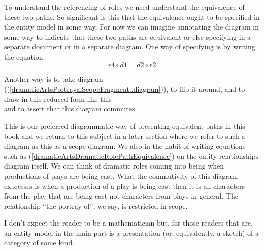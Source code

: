 \begin{reinstatett}
\begin{reinstatett}
To understand the referencing of roles we need understand the equivalence of these two paths. 
So significant is this that the equivalence ought to be specified in the entity model in some way.
For now we can imagine annotating the diagram in some way to indicate that these two paths are equivalent 
or else specifying in a separate document or in a separate diagram. 
One way of specifying is by writing the equation
\begin{equation}
\label{dramaticArtsDramaticRolePathEquivalence}
r4 \circ d1 = d2 \circ r2
\end{equation}

Another way is to take diagram ((\ref{dramaticArtsPortrayalScopeFragment..diagram})), 
to flip it  around, and to draw  in this reduced form like this
\begin{equation}
\label{dramaticArtsPortrayalScopeAppearance1}

\end{equation}
and to assert that this diagram commutes.

This is our preferred diagrammatic way of presenting equivalent paths in this book and we return to this subject in a later section where we refer to such a diagram as this as a scope diagram. 
We also in the habit of writing equations such as (\ref{dramaticArtsDramaticRolePathEquivalence}) on the entity relationships diagram itself.
We can think of dramatic roles coming into being when productions of plays are being cast. What the commutivity of this diagram expresses is when a production of a play is being cast then it is all characters from the play that are being cast not characters from plays in general. 
The relationship ``the portray of'', we say, is restricted in scope.
\end{reinstatett}

\end{reinstatett}

\mynote
I don't expect the reader to be a mathematician but, for those readers that are, an entity model in the main part is a presentation 
(or, equivalently, a sketch) of a category of some kind. 


